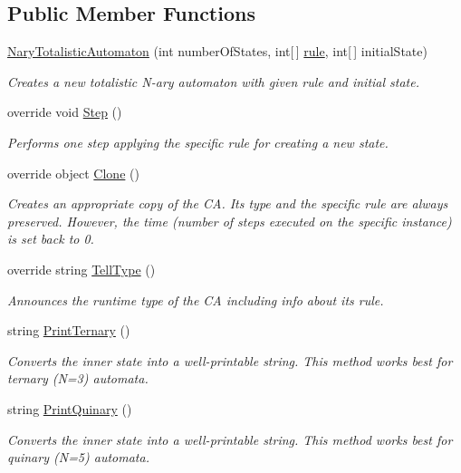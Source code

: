 \subsection*{Public Member Functions}
\begin{DoxyCompactItemize}
\item 
\hyperlink{class_cellular_1_1_nary_totalistic_automaton_aafe92ae99ccbb3591b128d6e720227f6}{Nary\+Totalistic\+Automaton} (int number\+Of\+States, int\mbox{[}$\,$\mbox{]} \hyperlink{class_cellular_1_1_nary_totalistic_automaton_a878c767c6823bd8ed8dc0f7d2ccb1fd2}{rule}, int\mbox{[}$\,$\mbox{]} initial\+State)
\begin{DoxyCompactList}\small\item\em Creates a new totalistic N-\/ary automaton with given rule and initial state. \end{DoxyCompactList}\item 
override void \hyperlink{class_cellular_1_1_nary_totalistic_automaton_ad90769a438ab94b46d4750a571782056}{Step} ()
\begin{DoxyCompactList}\small\item\em Performs one step applying the specific rule for creating a new state. \end{DoxyCompactList}\item 
override object \hyperlink{class_cellular_1_1_nary_totalistic_automaton_a13f16113915ecec451fc4764a32044f9}{Clone} ()
\begin{DoxyCompactList}\small\item\em Creates an appropriate copy of the C\+A. Its type and the specific rule are always preserved. However, the time (number of steps executed on the specific instance) is set back to 0. \end{DoxyCompactList}\item 
override string \hyperlink{class_cellular_1_1_nary_totalistic_automaton_aa691c532a55638c7e3d0c125a4244773}{Tell\+Type} ()
\begin{DoxyCompactList}\small\item\em Announces the runtime type of the C\+A including info about its rule. \end{DoxyCompactList}\item 
string \hyperlink{class_cellular_1_1_nary_totalistic_automaton_a239c8e21ae35741c4baadb96be21cec9}{Print\+Ternary} ()
\begin{DoxyCompactList}\small\item\em Converts the inner state into a well-\/printable string. This method works best for ternary (N=3) automata. \end{DoxyCompactList}\item 
string \hyperlink{class_cellular_1_1_nary_totalistic_automaton_aa9d5e154d625d8a8884221df45766145}{Print\+Quinary} ()
\begin{DoxyCompactList}\small\item\em Converts the inner state into a well-\/printable string. This method works best for quinary (N=5) automata. \end{DoxyCompactList}\end{DoxyCompactItemize}
